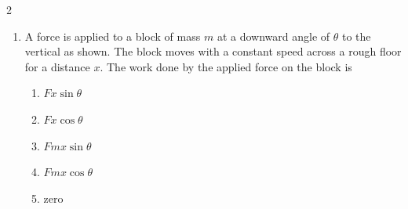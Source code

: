 {\begin{multicols*}{2}
\begin{enumerate}[leftmargin=12pt,itemsep=4pt]
    \item A force is applied to a block of mass $m$ at a downward angle of
      $\theta$ to the vertical as shown. The block moves with a constant speed
      across a rough floor for a distance $x$. The work done by the applied
      force on the block is
      \begin{center}
      \end{center}
      \begin{enumerate}
      \item $Fx\sin\theta$
      \item $Fx\cos\theta$
      \item $Fmx\sin\theta$
      \item $Fmx\cos\theta$
      \item zero
      \end{enumerate}


\end{enumerate}
\end{multicols*}}
